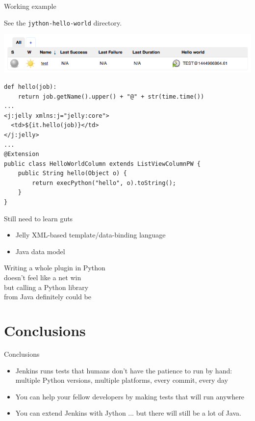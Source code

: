 \documentclass[xcolor=svgnames,17pt]{beamer}
\newcommand*{\sizefont}[1]{%
    \ifcase#1\relax
    \or \tiny
    \or \scriptsize
    \or \footnotesize
    \or \small
    \or \normalsize
    \or \large
    \or \Large
    \or \LARGE
    \or \huge
    \or \Huge
    \fi}
\begin{document}
\begin{frame}[fragile]{Working example}

See the \texttt{jython-hello-world} directory.

\includegraphics[width=\textwidth]{jython-hello-world.png}

\vspace*{-0.5\baselineskip}

{\sizefont{1}
\begin{verbatim}
def hello(job):
    return job.getName().upper() + "@" + str(time.time())
...
<j:jelly xmlns:j="jelly:core">
  <td>${it.hello(job)}</td>
</j:jelly>
...
@Extension
public class HelloWorldColumn extends ListViewColumnPW {
    public String hello(Object o) {
        return execPython("hello", o).toString();
    }
}
\end{verbatim}
}

\end{frame}

\begin{frame}{Still need to learn guts}
\begin{itemize}
\item Jelly XML-based template/data-binding language
\item Java data model
\end{itemize}
\pause

\begin{center}
Writing a whole plugin in Python \\ doesn’t feel like a net win \\
\pause
but calling a Python library \\ from Java definitely could be
\end{center}

\end{frame}

\section{Conclusions}

\begin{frame}{}
\tableofcontents[currentsection]
\end{frame}

\begin{frame}{Conclusions}
\begin{itemize}
\item Jenkins runs tests that humans don’t have the patience to run by
hand: multiple Python versions, multiple platforms, every commit, every day
\pause
\item You can help your fellow developers by making tests that will run
anywhere
\pause
\item You can extend Jenkins with Jython ...
\pause but there will still be a lot of Java.
\end{itemize}
\end{frame}
\end{document}
